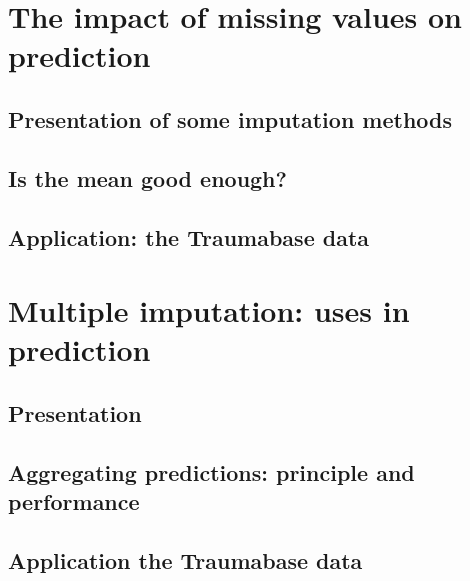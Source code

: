 \documentclass[12pt, a4paper]{article}
\begin{document}
\section{The impact of missing values on prediction}
\subsection{Presentation of some imputation methods}
\subsection{Is the mean good enough?}
\subsection{Application: the Traumabase data}

\section{Multiple imputation: uses in prediction}
\subsection{Presentation}
\subsection{Aggregating predictions: principle and performance}
\subsection{Application the Traumabase data}
\end{document}
